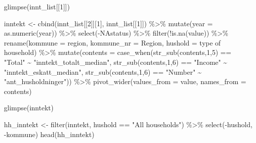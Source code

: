 \documentclass[
  norsk,
  letterpaper,
  DIV=11,
  numbers=noendperiod]{scrreprt}
\newenvironment{Shaded}{\begin{snugshade}}{\end{snugshade}}
\newcommand{\AttributeTok}[1]{\textcolor[rgb]{0.40,0.45,0.13}{#1}}
\newcommand{\DecValTok}[1]{\textcolor[rgb]{0.68,0.00,0.00}{#1}}
\newcommand{\FunctionTok}[1]{\textcolor[rgb]{0.28,0.35,0.67}{#1}}
\newcommand{\NormalTok}[1]{\textcolor[rgb]{0.00,0.23,0.31}{#1}}
\newcommand{\OtherTok}[1]{\textcolor[rgb]{0.00,0.23,0.31}{#1}}
\newcommand{\SpecialCharTok}[1]{\textcolor[rgb]{0.37,0.37,0.37}{#1}}
\newcommand{\StringTok}[1]{\textcolor[rgb]{0.13,0.47,0.30}{#1}}
\theoremstyle{definition}
\theoremstyle{remark}
\begin{document}
\begin{Shaded}
\begin{Highlighting}[]
\FunctionTok{glimpse}\NormalTok{(innt\_list[[}\DecValTok{1}\NormalTok{]])}

\NormalTok{inntekt }\OtherTok{\textless{}{-}} \FunctionTok{cbind}\NormalTok{(innt\_list[[}\DecValTok{2}\NormalTok{]][}\DecValTok{1}\NormalTok{], innt\_list[[}\DecValTok{1}\NormalTok{]]) }\SpecialCharTok{\%\textgreater{}\%} 
  \FunctionTok{mutate}\NormalTok{(}\AttributeTok{year =} \FunctionTok{as.numeric}\NormalTok{(year)) }\SpecialCharTok{\%\textgreater{}\%} 
  \FunctionTok{select}\NormalTok{(}\SpecialCharTok{{-}}\NormalTok{NAstatus) }\SpecialCharTok{\%\textgreater{}\%} 
  \FunctionTok{filter}\NormalTok{(}\SpecialCharTok{!}\FunctionTok{is.na}\NormalTok{(value)) }\SpecialCharTok{\%\textgreater{}\%} 
  \FunctionTok{rename}\NormalTok{(}\AttributeTok{kommune =}\NormalTok{ region, }\AttributeTok{kommune\_nr =}\NormalTok{ Region,}
         \AttributeTok{hushold =} \StringTok{\textasciigrave{}}\AttributeTok{type of household}\StringTok{\textasciigrave{}}\NormalTok{) }\SpecialCharTok{\%\textgreater{}\%} 
  \FunctionTok{mutate}\NormalTok{(}\AttributeTok{contents =} \FunctionTok{case\_when}\NormalTok{(}\FunctionTok{str\_sub}\NormalTok{(contents,}\DecValTok{1}\NormalTok{,}\DecValTok{5}\NormalTok{) }\SpecialCharTok{==} \StringTok{"Total"} \SpecialCharTok{\textasciitilde{}} \StringTok{"inntekt\_totalt\_median"}\NormalTok{,}
                             \FunctionTok{str\_sub}\NormalTok{(contents,}\DecValTok{1}\NormalTok{,}\DecValTok{6}\NormalTok{) }\SpecialCharTok{==} \StringTok{"Income"} \SpecialCharTok{\textasciitilde{}} \StringTok{"inntekt\_eskatt\_median"}\NormalTok{,}
                             \FunctionTok{str\_sub}\NormalTok{(contents,}\DecValTok{1}\NormalTok{,}\DecValTok{6}\NormalTok{) }\SpecialCharTok{==} \StringTok{"Number"} \SpecialCharTok{\textasciitilde{}} \StringTok{"ant\_husholdninger"}\NormalTok{)) }\SpecialCharTok{\%\textgreater{}\%}
  \FunctionTok{pivot\_wider}\NormalTok{(}\AttributeTok{values\_from =}\NormalTok{ value, }\AttributeTok{names\_from =}\NormalTok{ contents)}
  
\FunctionTok{glimpse}\NormalTok{(inntekt)}

\NormalTok{hh\_inntekt }\OtherTok{\textless{}{-}} \FunctionTok{filter}\NormalTok{(inntekt, hushold }\SpecialCharTok{==} \StringTok{"All households"}\NormalTok{) }\SpecialCharTok{\%\textgreater{}\%} 
  \FunctionTok{select}\NormalTok{(}\SpecialCharTok{{-}}\NormalTok{hushold, }\SpecialCharTok{{-}}\NormalTok{kommune)}
\FunctionTok{head}\NormalTok{(hh\_inntekt)}









\end{Highlighting}
\end{Shaded}
\end{document}
